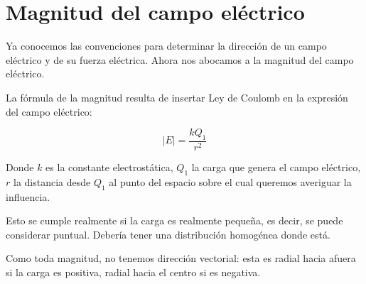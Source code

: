 \section{Magnitud del campo eléctrico}

Ya conocemos las convenciones para determinar la dirección 
de un campo eléctrico y de su fuerza eléctrica.
Ahora nos abocamos a la magnitud del campo eléctrico.

La fórmula de la magnitud resulta de insertar Ley de Coulomb 
en la expresión del campo eléctrico:

\vspace{.3cm}
\begin{equation}
    |E| = \frac{kQ_1}{r^{2}}
\end{equation}
\vspace{.3cm}

Donde \(k\) es la constante electrostática,
\(Q_1\) la carga que genera el campo eléctrico,
\(r\) la distancia desde \(Q_1\) al punto
del espacio sobre el cual queremos averiguar la influencia.

Esto se cumple realmente si la carga es realmente pequeña,
es decir,
se puede considerar puntual.
Debería tener una distribución homogénea donde está.

Como toda magnitud, no tenemos dirección vectorial:
esta es radial hacia afuera si la carga es positiva,
radial hacia el centro si es negativa.